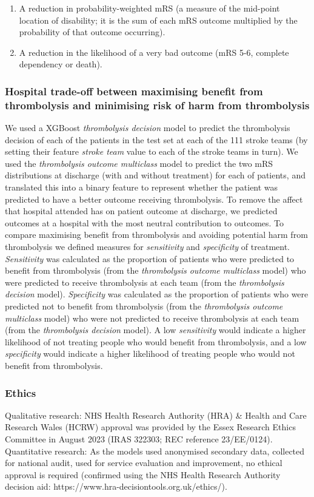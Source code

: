 \begin{enumerate}
    \item A reduction in probability-weighted mRS (a measure of the mid-point location of disability; it is the sum of each mRS outcome multiplied by the probability of that outcome occurring).
    \item A reduction in the likelihood of a very bad outcome (mRS 5-6, complete dependency or death).
\end{enumerate}

\subsubsection{Hospital trade-off between maximising benefit from thrombolysis and minimising risk of harm from thrombolysis}

We used a XGBoost \textit{thrombolysis decision} model to predict the thrombolysis decision of each of the patients in the test set at each of the 111 stroke teams (by setting their feature \textit{stroke team} value to each of the stroke teams in turn). We used the \textit{thrombolysis outcome multiclass} model to predict the two mRS distributions at discharge (with and without treatment) for each of patients, and translated this into a binary feature to represent whether the patient was predicted to have a better outcome receiving thrombolysis. To remove the affect that hospital attended has on patient outcome at discharge, we predicted outcomes at a hospital with the most neutral contribution to outcomes. To compare maximising benefit from thrombolysis and avoiding potential harm from thrombolysis we defined measures for \textit{sensitivity} and \textit{specificity} of treatment. \textit{Sensitivity} was calculated as the proportion of patients who were predicted to benefit from thrombolysis (from the \textit{thrombolysis outcome multiclass} model) who were predicted to receive thrombolysis at each team (from the \textit{thrombolysis decision} model). \textit{Specificity} was calculated as the proportion of patients who were predicted not to benefit from thrombolysis (from the \textit{thrombolysis outcome multiclass} model) who were not predicted to receive thrombolysis at each team (from the \textit{thrombolysis decision} model). A low \textit{sensitivity} would indicate a higher likelihood of not treating people who would benefit from thrombolysis, and a low \textit{specificity} would indicate a higher likelihood of treating people who would not benefit from thrombolysis.

\subsubsection{Ethics}

Qualitative research: NHS Health Research Authority (HRA) \& Health and Care Research Wales (HCRW) approval was provided by the Essex Research Ethics Committee in August 2023 (IRAS 322303; REC reference 23/EE/0124). Quantitative research: As the models used anonymised secondary data, collected for national audit, used for service evaluation and improvement, no ethical approval is required (confirmed using the NHS Health Research Authority decision aid: https://www.hra-decisiontools.org.uk/ethics/).